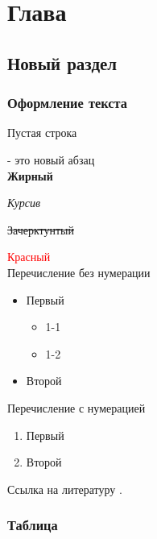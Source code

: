 \chapter{Глава}
\label{cha:chapter}

\section{Новый раздел}

\subsection{Оформление текста}
Пустая строка

- это новый абзац\\%

\textbf{Жирный}

\textit{Курсив}

\sout{Зачерктунтый}

\textcolor{red}{Красный}\\

Перечисление без нумерации
\begin{itemize}
	\item Первый
	\begin{itemize}
		\item 1-1
		\item 1-2
	\end{itemize}
	\item Второй\\
\end{itemize}

Перечисление с нумерацией

\begin{enumerate}
	\item Первый
	\item Второй\\
\end{enumerate}

Ссылка на литературу \cite{Pup09}.

\subsection{Таблица}



